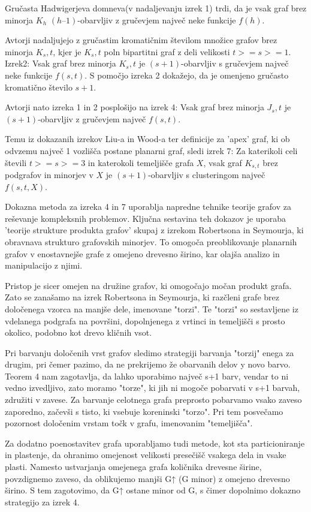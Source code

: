\documentclass{article}
\begin{document}
Gručasta Hadwigerjeva domneva(v nadaljevanju izrek 1) trdi, da je vsak graf brez minorja $K_h$ $(h – 1)$-obarvljiv z gručevjem največ neke funkcije $f(h)$. 

Avtorji nadaljujejo z gručastim kromatičnim številom množice grafov brez minorja $K_s,t$, kjer je $K_s,t$ poln bipartitni graf z deli velikosti $t>=s>=1$.
Izrek2:
Vsak graf brez minorja $K_s,t$ je $(s+1)$-obarvljiv s gručevjem največ neke funkcije $f(s,t)$.
S pomočjo izreka 2 dokažejo, da je omenjeno gručasto kromatično število $s+1$.

Avtorji nato izreka 1 in 2 posplošijo na izrek 4:
Vsak graf brez minorja $J_s,t$ je $(s+1)$-obarvljiv z gručevjem največ $f(s, t)$.

Temu iz dokazanih izrekov Liu-a in Wood-a ter definicije za 'apex' graf, ki ob odvzemu največ 1 vozlišča postane planarni graf, sledi izrek 7:
Za katerikoli celi števili $t >= s >= 3$ in katerokoli temeljišče grafa $X$, vsak graf $K_{s,t}$ brez podgrafov in minorjev v $X$ je $(s + 1)$-obarvljiv s clusteringom največ $f(s, t, X)$.

Dokazna metoda za izreka 4 in 7 uporablja napredne tehnike teorije grafov za reševanje kompleksnih problemov. Ključna sestavina teh dokazov je uporaba 'teorije strukture produkta grafov' skupaj z izrekom Robertsona in Seymourja, ki obravnava strukturo grafovskih minorjev. To omogoča preoblikovanje planarnih grafov v enostavnejše grafe z omejeno drevesno širino, kar olajša analizo in manipulacijo z njimi.

Pristop je sicer omejen na družine grafov, ki omogočajo močan produkt grafa. Zato se zanašamo na izrek Robertsona in Seymourja, ki razčleni grafe brez določenega vzorca na manjše dele, imenovane "torzi". Te "torzi" so sestavljene iz vdelanega podgrafa na površini, dopolnjenega z vrtinci in temeljišči s prosto okolico, podobno kot drevo kličnih vsot.


Pri barvanju določenih vrst grafov sledimo strategiji barvanja "torzij" enega za drugim, pri čemer pazimo, da ne prekrijemo že obarvanih delov y novo barvo. Teorem 4 nam zagotavlja, da lahko uporabimo največ s+1 barv, vendar to ni vedno izvedljivo, zato moramo "torze", ki jih ni mogoče pobarvati v s+1 barvah, združiti v zavese. Za barvanje celotnega grafa preprosto pobarvamo vsako zaveso zaporedno, začevši s tisto, ki vsebuje koreninski "torzo". Pri tem posvečamo pozornost določenim vrstam točk v grafu, imenovanim "temeljišča".

Za dodatno poenostavitev grafa uporabljamo tudi metode, kot sta particioniranje in plastenje, da ohranimo omejenost velikosti presečišč vsakega dela in vsake plasti. Namesto ustvarjanja omejenega grafa količnika drevesne širine, povzdignemo zaveso, da oblikujemo manjši G↑ (G minor) z omejeno drevesno širino. S tem zagotovimo, da G↑ ostane minor od G, s čimer dopolnimo dokazno strategijo za izrek 4.
\end{document}
